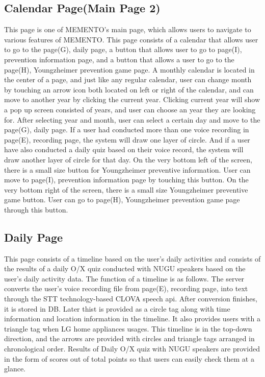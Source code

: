 \documentclass[conference]{IEEEtran}
\begin{document}
\subsection{Calendar Page(Main Page 2)}
This page is one of MEMENTO’s main page, which allows users to navigate to various features of MEMENTO. This page consists of a calendar that allows user to go to the page(G), daily page, a button that allows user to go to page(I), prevention information page, and a button that allows a user to go to the page(H), Youngzheimer prevention game page. A monthly calendar is located in the center of a page, and just like any regular calendar, user can change month by touching an arrow icon both located on left or right of the calendar, and can move to another year by clicking the current year. Clicking current year will show a pop up screen consisted of years, and user can choose an year they are looking for. After selecting year and month, user can select a certain day and move to the page(G), daily page. If a user had conducted more than one voice recording in page(E), recording page, the system will draw one layer of circle. And if a user have also conducted a daily quiz based on their voice record, the system will draw another layer of circle for that day. On the very bottom left of the screen, there is a small size button for Youngzheimer preventive information. User can move to page(I), prevention information page by touching this button. On the very bottom right of the screen, there is a small size Youngzheimer preventive game button. User can go to page(H), Youngzheimer prevention game page through this button.
\\
\subsection{Daily Page}
This page consists of a timeline based on the user's daily activities and consists of the results of a daily O/X quiz conducted with NUGU speakers based on the user's daily activity data. The function of a timeline is as follows. The server converts the user's voice recording file from page(E), recording page, into text through the STT technology-based CLOVA speech api. After conversion finishes, it is stored in DB. Later thist is provided as a circle tag along with time information and location information in the timeline. It also provides users with a triangle tag when LG home appliances usages. This timeline is in the top-down direction, and the arrows are provided with circles and triangle tags arranged in chronological order. Results of Daily O/X quiz with NUGU speakers are provided in the form of scores out of total points so that users can easily check them at a glance.
\\
\end{document}

